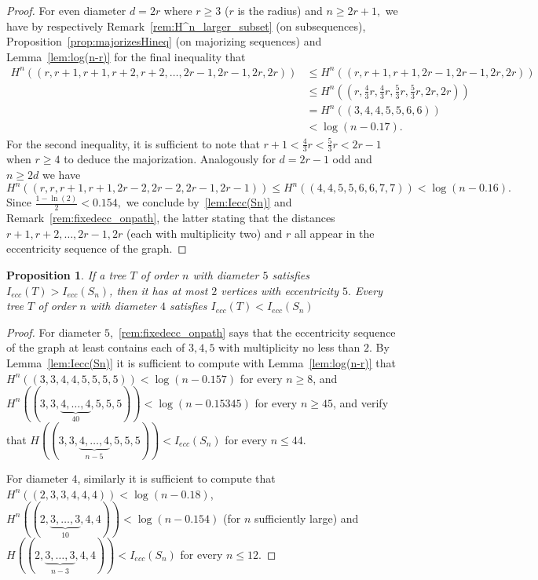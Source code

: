 \documentclass{article}
\newtheorem{prop}[defi]{Proposition}
\newcommand{\ecc}{ecc}
\begin{document}
{\begin{proof}
For even diameter $d=2r$ where $r \ge 3$ ($r$ is the radius) and $n \ge 2r+1,$ we have by respectively Remark~\ref{rem:H^n_larger_subset} (on subsequences), Proposition~\ref{prop:majorizesHineq} (on majorizing sequences) and Lemma~\ref{lem:log(n-r)} for the final inequality that
\begin{align*}
        H^n((r, r+1,r+1,r+2,r+2,\ldots, 2r-1,2r-1,2r,2r)) &\le H^n((r, r+1,r+1,2r-1,2r-1,2r,2r))\\ 
        &\le H^n((r, \frac 43 r,\frac 43 r,\frac 53 r,\frac 53 r,2r,2r))\\ 
        &= H^n((3,4,4,5,5,6,6))\\
        &<\log(n-0.17).
    \end{align*}
    For the second inequality, it is sufficient to note that $r+1 < \frac 43 r < \frac 53 r<2r-1 $ when $r \ge 4$ to deduce the majorization.
    Analogously for $d=2r-1$ odd and $n \ge 2d$ we have $$H^n((r,r, r+1,r+1,2r-2,2r-2,2r-1,2r-1)) \le H^n((4,4,5,5,6,6,7,7))<\log(n-0.16).$$
    Since $\frac {1-\ln(2)}{2}<0.154,$ we conclude by~\cref{lem:Iecc(Sn)} and Remark~\ref{rem:fixedecc_onpath}, the latter stating that the distances $r+1,r+2, \ldots, 2r-1,2r$ (each with multiplicity two) and $r$ all appear in the eccentricity sequence of the graph.
\end{proof}

\begin{prop}\label{prop:diam45_less_star}
    If a tree $T$ of order $n$ with diameter $5$ satisfies $I_{\ecc}(T)>I_{\ecc}(S_n)$, then it has at most $2$ vertices with eccentricity $5.$
    Every tree $T$ of order $n$ with diameter $4$ satisfies $I_{\ecc}(T)<I_{\ecc}(S_n)$
\end{prop}


\begin{proof}

    For diameter $5$,~\cref{rem:fixedecc_onpath} says that the eccentricity sequence of the graph at least contains each of $3,4,5$ with multiplicity no less than $2.$
    By Lemma~\ref{lem:Iecc(Sn)} it is sufficient to compute with Lemma~\ref{lem:log(n-r)} that\\ $H^n\left( (3,3,4,4,5,5,5,5) \right)< \log(n-0.157)$
     for every $n\geq 8$, and $H^n\left((3,3, \underbrace{4, \ldots, 4}_{40},5,5,5) \right)<\log(n-0.15345)$
     for every $n\geq 45$, and verify that
    $H\left((3,3, \underbrace{4, \ldots, 4}_{n-5},5,5,5) \right)<I_{\ecc}(S_n)$ for every $n \le 44.$

    For diameter $4$, similarly it is sufficient to compute that $H^n\left( (2,3,3,4,4,4) \right)< \log(n-0.18)$,\\$H^n\left((2,\underbrace{3, \ldots, 3}_{10},4,4) \right)<\log(n-0.154)$ (for $n$ sufficiently large)
    and $H\left((2,\underbrace{3, \ldots, 3}_{n-3},4,4) \right)<I_{\ecc}(S_n)$ for every $n \le 12.$ 
\end{proof}

}
\end{document}
